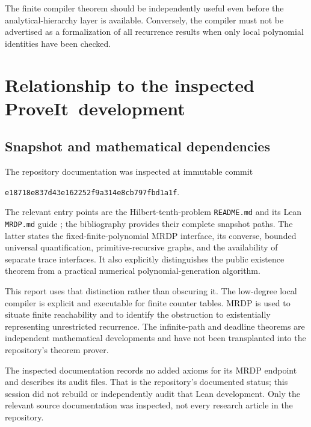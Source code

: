 \documentclass[11pt,letterpaper]{article}
\theoremstyle{definition}
\theoremstyle{remark}
\newcommand{\code}[1]{\texttt{#1}}
\newcommand{\1}{\mathbf 1}
\newcommand{\repo}{\textsf{ProveIt}}
\newcommand{\srctag}[1]{\texorpdfstring{\hspace{0.4em}{\normalfont\small\color{accent}[source #1]}}{ [source #1]}}
\begin{document}
The finite compiler theorem should be independently useful even before the
analytical-hierarchy layer is available. Conversely, the compiler must not
be advertised as a formalization of all recurrence results when only local
polynomial identities have been checked.
\section{Relationship to the inspected \repo\ development\srctag{11}}
\label{lbh:ql:sec:repository}

\subsection{Snapshot and mathematical dependencies}
The repository documentation was inspected at immutable commit
\begin{center}
\small\code{e18718e837d43e162252f9a314e8cb797fbd1a1f}.
\end{center}
The relevant entry points are the Hilbert-tenth-problem \code{README.md}
and its Lean \code{MRDP.md} guide \cite{ql-repo-root,ql-repo-mrdp}; the bibliography
provides their complete snapshot paths. The latter states the fixed-finite-polynomial MRDP
interface, its converse, bounded universal quantification, primitive-recursive
graphs, and the availability of separate trace interfaces. It also explicitly
distinguishes the public existence theorem from a practical numerical
polynomial-generation algorithm.

This report uses that distinction rather than obscuring it. The low-degree
local compiler is explicit and executable for finite counter tables. MRDP is
used to situate finite reachability and to identify the obstruction to
existentially representing unrestricted recurrence. The infinite-path and
deadline theorems are independent mathematical developments and have not been
transplanted into the repository's theorem prover.

The inspected documentation records no added axioms for its MRDP endpoint
and describes its audit files. That is the repository's documented status;
this session did not rebuild or independently audit that Lean development.
Only the relevant source documentation was inspected, not every research
article in the repository.
\end{document}

